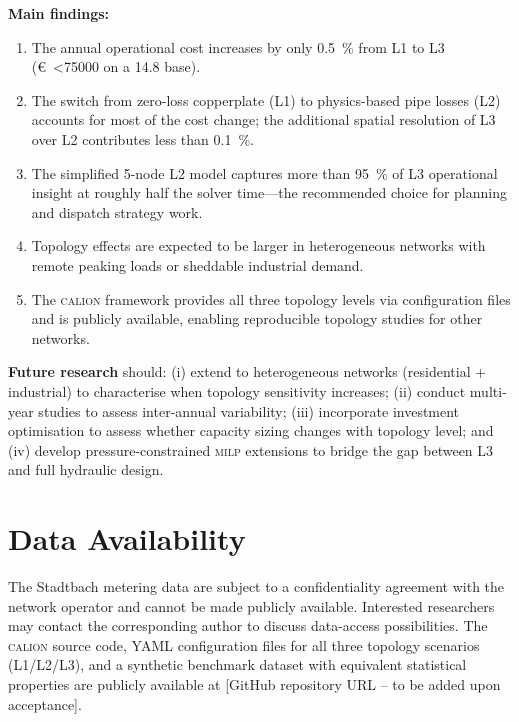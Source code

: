 \documentclass[a4paper,fleqn]{cas-sc}
\newcommand{\milp}{\textsc{milp}}
\newcommand{\calion}{\textsc{calion}}
\begin{document}
\textbf{Main findings:}

\begin{enumerate}
  \item The annual operational cost increases by only \SI{+0.5}{\percent}
        from L1 to L3 (\SI{<75000}[\euro]{} on a \SI{14.8}[\mega\EUR]{} base).

  \item The switch from zero-loss copperplate (L1) to physics-based pipe losses
        (L2) accounts for most of the cost change; the additional spatial
        resolution of L3 over L2 contributes less than \SI{0.1}{\percent}.

  \item The simplified 5-node L2 model captures more than \SI{95}{\percent}
        of L3 operational insight at roughly half the solver time---the
        recommended choice for planning and dispatch strategy work.

  \item Topology effects are expected to be larger in heterogeneous networks
        with remote peaking loads or sheddable industrial demand.

  \item The \calion{} framework provides all three topology levels via
        configuration files and is publicly available, enabling reproducible
        topology studies for other networks.
\end{enumerate}

\textbf{Future research} should: (i) extend to heterogeneous networks
(residential + industrial) to characterise when topology sensitivity
increases; (ii) conduct multi-year studies to assess inter-annual variability;
(iii) incorporate investment optimisation to assess whether capacity sizing
changes with topology level; and (iv) develop pressure-constrained \milp{}
extensions to bridge the gap between L3 and full hydraulic design.

\section*{Data Availability}
\label{sec:data}

The Stadtbach metering data are subject to a confidentiality agreement with
the network operator and cannot be made publicly available.  Interested
researchers may contact the corresponding author to discuss data-access
possibilities.  The \calion{} source code, YAML configuration files for
all three topology scenarios (L1/L2/L3), and a synthetic benchmark dataset
with equivalent statistical properties are publicly available at
[GitHub repository URL -- to be added upon acceptance].
\end{document}
